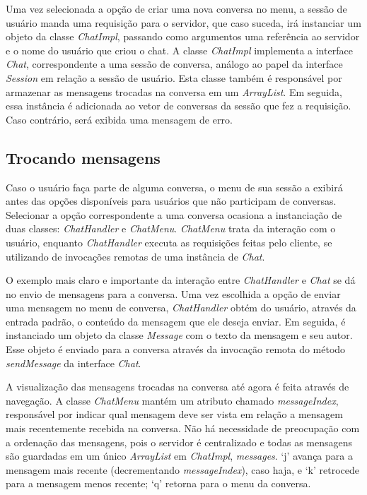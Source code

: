 \documentclass[../main.tex]{subfiles}
\begin{document}
Uma vez selecionada a opção de criar uma nova conversa no menu, a sessão de usuário manda uma requisição para o servidor, que caso suceda, irá instanciar um objeto da classe \textit{ChatImpl}, passando como argumentos uma referência ao servidor e o nome do usuário que criou o chat.
A classe \textit{ChatImpl} implementa a interface \textit{Chat}, correspondente a uma sessão de conversa, análogo ao papel da interface \textit{Session} em relação a sessão de usuário.
Esta classe também é responsável por armazenar as mensagens trocadas na conversa em um \textit{ArrayList}.
Em seguida, essa instância é adicionada ao vetor de conversas da sessão que fez a requisição.
Caso contrário, será exibida uma mensagem de erro.

\subsection{Trocando mensagens}

Caso o usuário faça parte de alguma conversa, o menu de sua sessão a exibirá antes das opções disponíveis para usuários que não participam de conversas.
Selecionar a opção correspondente a uma conversa ocasiona a instanciação de duas classes: \textit{ChatHandler} e \textit{ChatMenu}.
\textit{ChatMenu} trata da interação com o usuário, enquanto \textit{ChatHandler} executa as requisições feitas pelo cliente, se utilizando de invocações remotas de uma instância de \textit{Chat}.

O exemplo mais claro e importante da interação entre \textit{ChatHandler} e \textit{Chat} se dá no envio de mensagens para a conversa.
Uma vez escolhida a opção de enviar uma mensagem no menu de conversa, \textit{ChatHandler} obtém do usuário, através da entrada padrão, o conteúdo da mensagem que ele deseja enviar.
Em seguida, é instanciado um objeto da classe \textit{Message} com o texto da mensagem e seu autor.
Esse objeto é enviado para a conversa através da invocação remota do método \textit{sendMessage} da interface \textit{Chat}.

A visualização das mensagens trocadas na conversa até agora é feita através de navegação.
A classe \textit{ChatMenu} mantém um atributo chamado \textit{messageIndex}, responsável por indicar qual mensagem deve ser vista em relação a mensagem mais recentemente recebida na conversa.
Não há necessidade de preocupação com a ordenação das mensagens, pois o servidor é centralizado e todas as mensagens são guardadas em um único \textit{ArrayList} em \textit{ChatImpl}, \textit{messages}.
`j' avança para a mensagem mais recente (decrementando \textit{messageIndex}), caso haja, e `k' retrocede para a mensagem menos recente; `q' retorna para o menu da conversa.
\end{document}
